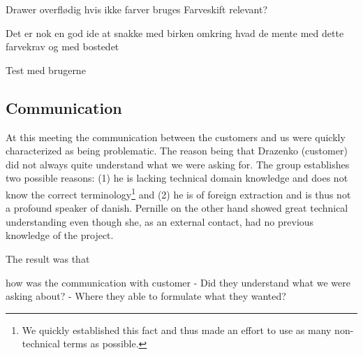 Drawer overflødig hvis ikke farver bruges
Farveskift relevant?

Det er nok en god ide at
snakke med birken omkring hvad de mente med dette farvekrav og med bostedet

Test med brugerne

\subsection{Communication}
At this meeting the communication between the customers and us were quickly characterized as being problematic.
The reason being that Drazenko (customer) did not always quite understand what we were asking for.
The group establishes two possible reasons:
(1) he is lacking technical domain knowledge and does not know the correct terminology\footnote{We quickly established this fact and thus made an effort to use as many non-technical terms as possible.} and (2) he is of foreign extraction and is thus not a profound speaker of danish.
Pernille on the other hand showed great technical understanding even though she, as an external contact, had no previous knowledge of the \giraf project.

The result was that 

how was the communication with customer
- Did they understand what we were asking about?
- Where they able to formulate what they wanted?
